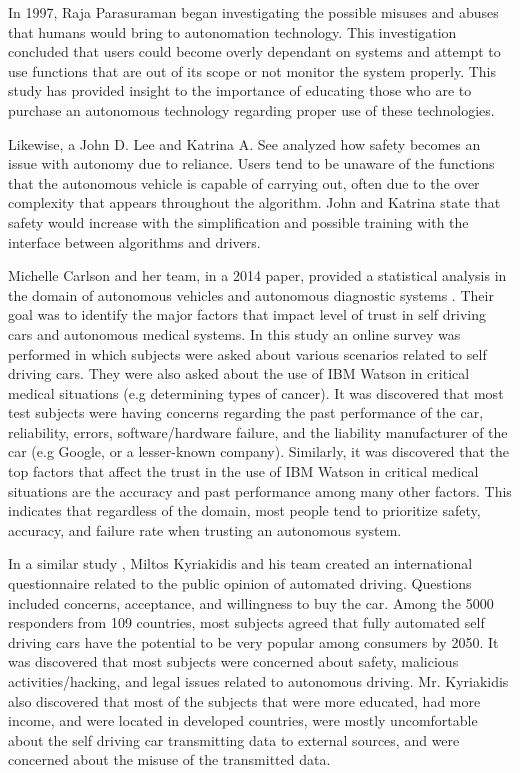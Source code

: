 \documentclass[runningheads,a4paper]{llncs}
\begin{document}
In 1997, Raja Parasuraman began investigating the possible misuses and abuses that humans would bring to autonomation technology\cite{parasuraman1997humans}.  This investigation concluded that users could become overly dependant on systems and attempt to use functions that are out of its scope or not monitor the system properly.  This study has provided insight to the importance of educating those who are to purchase an autonomous technology regarding proper use of these technologies.

Likewise, a John D. Lee and Katrina A. See analyzed how safety becomes an issue with autonomy due to reliance\cite{lee2004trust}.  Users tend to be unaware of the functions that the autonomous vehicle is capable of carrying out, often due to the over complexity that appears throughout the algorithm.  John and Katrina state that safety would increase with the simplification and possible training with the interface between algorithms and drivers. 

Michelle Carlson and her team, in a 2014 paper, provided a statistical analysis in the domain of autonomous vehicles and autonomous diagnostic systems \cite{carlson2014identifying}. Their goal was to identify the major factors that impact level of trust in self driving cars and autonomous medical systems. In this study an online survey was performed in which subjects were asked about various scenarios related to self driving cars. They were also asked about the use of IBM Watson in critical medical situations (e.g determining types of cancer). It was discovered that most test subjects were having concerns regarding the past performance of the car, reliability, errors, software/hardware failure, and the liability manufacturer of the car (e.g Google, or a lesser-known company). Similarly, it was discovered that the top factors that affect the trust in the use of IBM Watson in critical medical situations are the accuracy and past performance among many other factors. This indicates that regardless of the domain, most people tend to prioritize safety, accuracy, and failure rate when trusting an autonomous system.

In a similar study \cite{kyriakidis2015public}, Miltos Kyriakidis and his team created an international questionnaire related to the public opinion of automated driving. Questions included concerns, acceptance, and willingness to buy the car. Among the 5000 responders from 109 countries, most subjects agreed that fully automated self driving cars have the potential to be very popular among consumers by 2050. It was discovered that most subjects were concerned about safety, malicious activities/hacking, and legal issues related to autonomous driving. Mr. Kyriakidis also discovered that most of the subjects that were more educated, had more income, and were located in developed countries, were mostly uncomfortable about the self driving car transmitting data to external sources, and were concerned about the misuse of the transmitted data.
\end{document}
